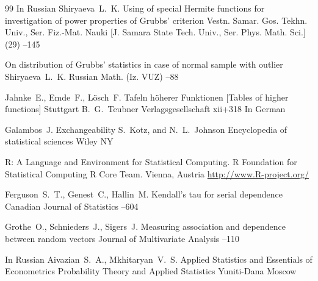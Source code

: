 \begin{thebibliography}{99}
\lang In Russian
\by Shiryaeva~L.~K.
\paper Using of special Hermite functions for investigation of power properties of Grubbs' criterion
\jour Vestn. Samar. Gos. Tekhn. Univ., Ser. Fiz.-Mat. Nauki \rm [J. Samara State Tech. Univ., Ser. Phys. Math. Sci.]
(29)
--145

\paper On distribution of Grubbs' statistics in case of normal sample with outlier
\by Shiryaeva~L.~K.
\jour Russian Math. (Iz. VUZ)
--88


\by Jahnke~E., Emde~F., L\"osch~F.
\book Tafeln h\"oherer Funktionen \rm [Tables of higher functions] 
\publaddr Stuttgart
\publ B.~G.~Teubner Verlagsgesellschaft
\totalpages xii+318
\lang In German

\by  Galambos~J.
\paper Exchangeability
\eds S.~Kotz, and N.~L.~Johnson 
\inbook Encyclopedia of statistical sciences
\publ Wiley
\publaddr NY


\preprint R: A Language and Environment for Statistical Computing. \rm  R Foundation for Statistical Computing
\by R Core Team.
\publaddr Vienna, Austria
\elink \url{http://www.R-project.org/}



\by  Ferguson~S.~T., Genest~C., Hallin~M. 
\paper Kendall’s tau for serial dependence
\jour Canadian Journal of Statistics
–604 


\by   Grothe~O.,  Schnieders~J., Sigers~J.
\paper Measuring association and dependence between random vectors
\jour Journal of Multivariate Analysis
--110 

\lang In Russian
\by   Aivazian~S.~A., Mkhitaryan~V.~S.
\book Applied Statistics and Essentials of Econometrics
\volinfo Probability Theory and Applied Statistics
\publ Yuniti-Dana
\publaddr Moscow

  
\end{thebibliography}

%
